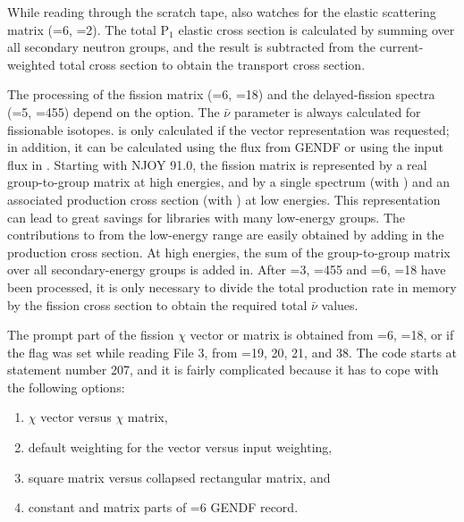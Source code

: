 While reading through the scratch tape,  also watches for
the elastic scattering matrix (=6, =2).  The total
P$_1$ elastic
cross section is calculated by summing over all secondary neutron groups,
and the result is subtracted from the current-weighted total cross section
to obtain the transport cross section.

The processing of the fission matrix (=6, =18) and
the delayed-fission
spectra (=5, =455) depend on the  option.  The
$\bar{\nu}$ parameter  is always calculated for fissionable
isotopes.   is only calculated if the vector representation
was requested; in addition, it can be calculated using the flux from GENDF
or using the input flux in .  Starting with NJOY 91.0, the
fission matrix is represented by a real group-to-group matrix at high
energies, and by a single spectrum  (with ) and an associated
production cross section (with ) at low energies.  This
representation can lead to great savings for libraries with many
low-energy groups.  The contributions to  from the
low-energy range are easily obtained by adding in the production
cross section.  At high energies, the sum of the group-to-group matrix
over all secondary-energy groups is added in.  After =3,
=455 and =6, =18 have been processed,
it is only necessary to divide the total
production rate in memory by the fission cross section to obtain the
required total $\bar{\nu}$ values.

The prompt part of the fission $\chi$ vector or matrix is obtained from
=6, =18, or if the  flag was set while
reading File 3,
from =19, 20, 21, and 38.  The code starts at statement number 207,
and it is fairly complicated because it has to cope with the following
options:

\begin{singlespace}
\begin{enumerate}
\item $\chi$ vector versus $\chi$ matrix,

\item default weighting for the vector versus input weighting,

\item square matrix versus collapsed rectangular matrix, and

\item constant and matrix parts of =6 GENDF record.
\end{enumerate}
\end{singlespace}

